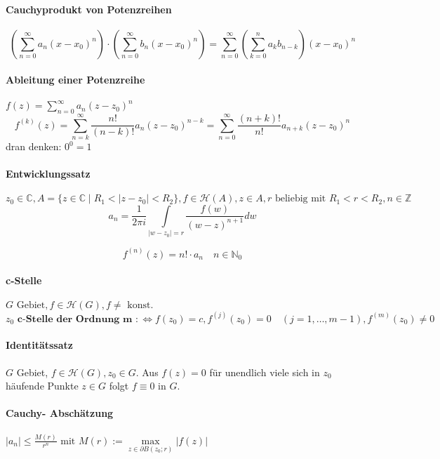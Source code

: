 \documentclass[a4paper, 10pt, DIV20, headings=small]{scrartcl}
\theoremstyle{definition}
\theoremstyle{plain}
\begin{document}
\paragraph{Cauchyprodukt von Potenzreihen}
$$\left( \sum\limits_{n=0}^{\infty}{a_n (x-x_0)^n} \right) \cdot 
\left( \sum\limits_{n=0}^{\infty}{b_n (x-x_0)^n} \right) =
\sum\limits_{n=0}^{\infty} \left( \sum\limits_{k=0}^n{a_k b_{n-k}} \right) (x-x_0)^n$$

\paragraph{Ableitung einer Potenzreihe} $f(z) = \sum\limits_{n=0}^{\infty}{a_n (z-z_0)^n}$
$$f^{(k)}(z) = \sum\limits_{n=k}^{\infty}{\frac{n!}{(n-k)!} a_n (z-z_0)^{n-k}} = \sum\limits_{n=0}^{\infty}{\frac{(n+k)!}{n!} a_{n+k} (z-z_0)^n}$$
dran denken: $0^0 = 1$

\paragraph{Entwicklungssatz}
$z_0 \in \mathbb{C}, A = \{z \in \mathbb{C} \mid R_1 < |z-z_0| < R_2 \}, f \in \mathcal{H}(A), z \in A, r \text{ beliebig mit } R_1 < r < R_2, n \in \mathbb{Z}$
$$a_n = \frac{1}{2 \pi i} \int\limits_{|w-z_0| = r} {\frac{f(w)}{(w-z)^{n+1}} dw}$$

$$f^{(n)}(z) = n! \cdot a_n \quad n \in \mathbb{N}_0$$

\paragraph{c-Stelle}
$G \text{ Gebiet}, f \in \mathcal{H}(G), f \neq \text{ konst.}$
$$z_0 \textbf{ c-Stelle der Ordnung m } :\Leftrightarrow f(z_0) = c, f^{(j)}(z_0) = 0 \quad (j = 1, \ldots, m-1), f^{(m)}(z_0) \neq 0$$

\paragraph{Identitätssatz}
$G$ Gebiet, $f \in \mathcal{H}(G), z_0 \in G$.
Aus $f(z)=0$ für unendlich viele sich in $z_0$ häufende Punkte $z \in G$ folgt $f \equiv 0$ in $G$.

\paragraph{Cauchy- Abschätzung}
$|a_n| \leq \frac{M(r)}{r^n} \text{ mit } M(r) := \max\limits_{z \in \partial B(z_0;r)}{|f(z)|}$
\end{document}
